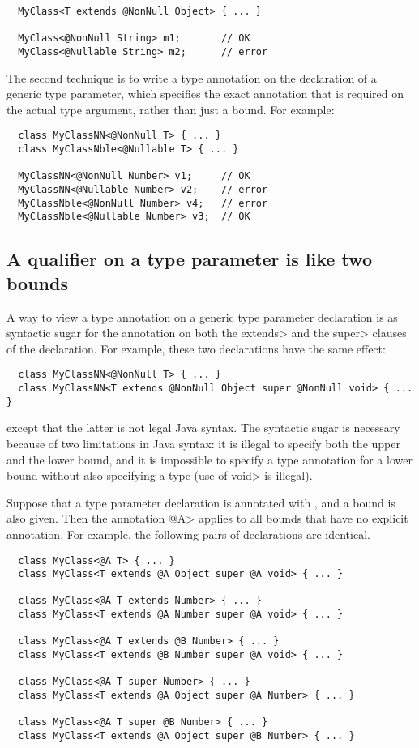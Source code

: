 \begin{Verbatim}
  MyClass<T extends @NonNull Object> { ... }

  MyClass<@NonNull String> m1;       // OK
  MyClass<@Nullable String> m2;      // error
\end{Verbatim}

The second technique is to write a type annotation on the declaration of a
generic type parameter, which specifies the exact annotation that is
required on the actual type argument, rather than just a bound.  For example:

\begin{Verbatim}
  class MyClassNN<@NonNull T> { ... }
  class MyClassNble<@Nullable T> { ... }

  MyClassNN<@NonNull Number> v1;     // OK
  MyClassNN<@Nullable Number> v2;    // error
  MyClassNble<@NonNull Number> v4;   // error
  MyClassNble<@Nullable Number> v3;  // OK
\end{Verbatim}

\subsection{A qualifier on a type parameter is like two bounds\label{qualifier-is-like-two-bounds}}

A way to view a type annotation on a generic type parameter declaration is
as syntactic sugar for the annotation on both the \<extends> and the
\<super> clauses of the declaration.  For example, these two declarations
have the same effect:

\begin{Verbatim}
  class MyClassNN<@NonNull T> { ... }
  class MyClassNN<T extends @NonNull Object super @NonNull void> { ... }
\end{Verbatim}

\noindent
except that the latter is not legal Java syntax.  The syntactic sugar is
necessary because of two limitations in Java syntax:  it is illegal to
specify both the upper and the
lower bound, and it is impossible to specify a type annotation for a lower
bound without also specifying a type (use of \<void> is illegal).

Suppose that a type parameter declaration is annotated with , and
a bound is also given.  Then the annotation \<@A> applies to all bounds
that have no
explicit annotation.  For example, the following pairs of declarations are
identical.

\begin{Verbatim}
  class MyClass<@A T> { ... }
  class MyClass<T extends @A Object super @A void> { ... }

  class MyClass<@A T extends Number> { ... }
  class MyClass<T extends @A Number super @A void> { ... }

  class MyClass<@A T extends @B Number> { ... }
  class MyClass<T extends @B Number super @A void> { ... }

  class MyClass<@A T super Number> { ... }
  class MyClass<T extends @A Object super @A Number> { ... }

  class MyClass<@A T super @B Number> { ... }
  class MyClass<T extends @A Object super @B Number> { ... }
\end{Verbatim}


